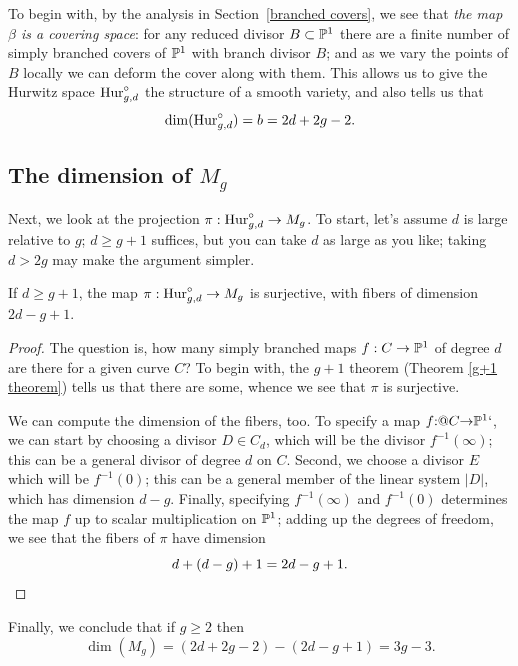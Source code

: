 To begin with, by the analysis in Section~\ref{branched covers}, we
see that \emph{the map $\beta$ is a covering space}: for any reduced
divisor $B \subset {\mathbb P}^1$ there are a finite number of simply branched
covers of ${\mathbb P}^1$ with branch divisor $B$; and as we vary the points
of $B$ locally we can deform the cover along with them. This allows us
to give the Hurwitz space $\mathrm{Hur}^\circ_{g,d}$ the structure of a smooth
variety, and also tells us that
$$
\vspace*{-4pt}
\dim(\Hur^\circ_{g,d}) = b = 2d+2g-2.
\vspace*{-4pt}
$$

\subsection*{The dimension of $M_g$}

Next, we look at the projection $\pi : \mathrm{Hur}^\circ_{g,d} \to M_g$. To
%
start, let's assume $d$ is large relative to $g$; $d \geq g+1$
suffices, but you can take $d$ as large as you like; taking $d > 2g$
may make the argument simpler. 

\begin{proposition}
If $d \geq g+1$, the map $\pi : 
\mathrm{Hur}^\circ_{g,d} \to M_g$ is surjective, with fibers of dimension $2d-g+1$.
\end{proposition}

\begin{proof}
The question is, how many simply branched maps $f : C \to {\mathbb P}^1$ of
degree $d$ are there 
for a given curve $C$?
To begin with, the 
$g+1$ theorem
%
(Theorem \ref{g+1 theorem}) tells us that
there are some, whence we see that $\pi$ is surjective.

We can compute the dimension of the fibers, too. 
\kern-1pt To specify a map 
$f {:}@ C {\to} {\mathbb P}^1`$, 
we can start by choosing a divisor $D \in C_d$, which
will be the divisor $f^{-1}(\infty)$; this can be a general divisor of
degree $d$ on $C$. Second, we choose a divisor $E$ which will be
$f^{-1}(0)$; this can be a general member of the linear system $|D|$,
which has dimension $d-g$. Finally, specifying $f^{-1}(\infty)$ and
$f^{-1}(0)$ determines the map $f$ up to scalar multiplication on
${\mathbb P}^1$; adding up the degrees of freedom, we see that the fibers of
$\pi$ have dimension 
$$
d + (d-g) + 1 = 2d-g+1.
\qed
$$
\let\qed\relax
\end{proof}

Finally, we conclude that if $g\geq2$ then
$$
\dim(M_g) = (2d+2g-2) - (2d - g + 1) = 3g-3.
$$

